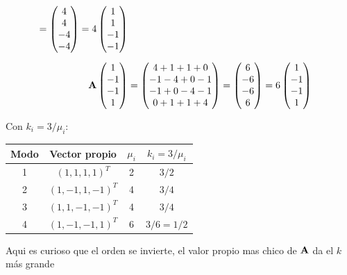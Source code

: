 \begin{align*}
	= \begin{pmatrix} 4\\ 4\\ -4\\ -4 \end{pmatrix} = 4\begin{pmatrix} 1\\ 1\\ -1\\ -1 \end{pmatrix}\\[6pt]
	\mathbf{A}\begin{pmatrix} 1\\ -1\\ -1\\ 1 \end{pmatrix}
	&= \begin{pmatrix} 4 + 1 + 1 + 0\\ -1 - 4 + 0 - 1\\ -1 + 0 - 4 - 1\\ 0 + 1 + 1 + 4 \end{pmatrix}
	= \begin{pmatrix} 6\\ -6\\ -6\\ 6 \end{pmatrix} = 6\begin{pmatrix} 1\\ -1\\ -1\\ 1 \end{pmatrix}
\end{align*}


Con $k_i = 3/\mu_i$:
\begin{center}
	\begin{tabular}{|c|c|c|c|}
		\hline
		Modo & Vector propio & $\mu_i$ & $k_i = 3/\mu_i$\\
		\hline
		1 & $(1, 1, 1, 1)^T$   & 2 & $3/2 $\\
		2 & $(1, -1, 1, -1)^T$ & 4 & $3/4 $\\
		3 & $(1, 1, -1, -1)^T$ & 4 & $3/4 $\\
		4 & $(1, -1, -1, 1)^T$ & 6 & $3/6 = 1/2$\\
		\hline
	\end{tabular}
\end{center}
Aqui es curioso que el orden se invierte, el valor propio mas chico de $\mathbf{A}$ da el $k$ más grande

